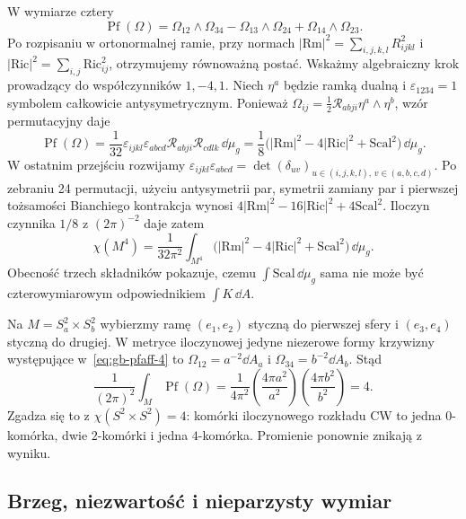 W wymiarze cztery
\begin{equation}\label{eq:gb-pfaff-4}
 \operatorname{Pf}(\Omega)=
 \Omega_{12}\wedge\Omega_{34}
 -\Omega_{13}\wedge\Omega_{24}
 +\Omega_{14}\wedge\Omega_{23}.
\end{equation}
Po rozpisaniu w ortonormalnej ramie, przy normach
$|\mathrm{Rm}|^2=\sum_{i,j,k,l}R_{ijkl}^2$ i
$|\mathrm{Ric}|^2=\sum_{i,j}\mathrm{Ric}_{ij}^2$,
otrzymujemy równoważną postać. Wskażmy algebraiczny krok
prowadzący do współczynników $1,-4,1$. Niech $\eta^a$
będzie ramką dualną i $\varepsilon_{1234}=1$ symbolem
całkowicie antysymetrycznym. Ponieważ
$\Omega_{ij}=\frac12\mathcal R_{abji}\eta^a\wedge\eta^b$,
wzór permutacyjny daje
\[
 \operatorname{Pf}(\Omega)
 =\frac1{32}\varepsilon_{ijkl}\varepsilon_{abcd}
       \mathcal R_{abji}\mathcal R_{cdlk}\,\dd\mu_g
 =\frac18\bigl(|\mathrm{Rm}|^2-4|\mathrm{Ric}|^2
                         +\mathrm{Scal}^2\bigr)\,\dd\mu_g.
\]
W ostatnim przejściu rozwijamy
$\varepsilon_{ijkl}\varepsilon_{abcd}
=\det(\delta_{u v})_{u\in(i,j,k,l),\,v\in(a,b,c,d)}$.
Po zebraniu 24 permutacji, użyciu antysymetrii par,
symetrii zamiany par i pierwszej tożsamości Bianchiego
kontrakcja wynosi
$4|\mathrm{Rm}|^2-16|\mathrm{Ric}|^2+4\mathrm{Scal}^2$.
Iloczyn czynnika $1/8$ z $(2\pi)^{-2}$ daje zatem
\begin{equation}\label{eq:gb-4d}
 \chi(M^4)=\frac1{32\pi^2}\int_{M^4}
 \bigl(|\mathrm{Rm}|^2-4|\mathrm{Ric}|^2
                    +\mathrm{Scal}^2\bigr)\,\dd\mu_g.
\end{equation}
Obecność trzech składników pokazuje, czemu
$\int\mathrm{Scal}\,\dd\mu_g$ sama nie może być
czterowymiarowym odpowiednikiem $\int K\,\dd A$.

\begin{przyklad}
Na $M=S_a^2\times S_b^2$ wybierzmy ramę $(e_1,e_2)$
styczną do pierwszej sfery i $(e_3,e_4)$ styczną do
drugiej. W metryce iloczynowej jedyne niezerowe formy
krzywizny występujące w~\eqref{eq:gb-pfaff-4} to
$\Omega_{12}=a^{-2}\dd A_a$ i
$\Omega_{34}=b^{-2}\dd A_b$. Stąd
\[
 \frac1{(2\pi)^2}\int_M\operatorname{Pf}(\Omega)
 =\frac1{4\pi^2}
   \left(\frac{4\pi a^2}{a^2}\right)
   \left(\frac{4\pi b^2}{b^2}\right)=4.
\]
Zgadza się to z $\chi(S^2\times S^2)=4$:
komórki iloczynowego rozkładu CW to jedna $0$-komórka,
dwie $2$-komórki i jedna $4$-komórka. Promienie ponownie
znikają z wyniku.
\end{przyklad}

\subsection*{Brzeg, niezwartość i nieparzysty wymiar}

